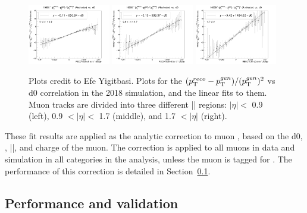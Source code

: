 \begin{figure}[!htb]
      \centering
      \captionsetup{justification=justified}
      \includegraphics[width=0.32\textwidth]{pics/muon_corr/GeoFit/fit_results/2018_DY_eta_0_0p9_dRelPt2p0_Roch.png}
      \includegraphics[width=0.32\textwidth]{pics/muon_corr/GeoFit/fit_results/2018_DY_eta_0p9_1p7_dRelPt2p0_Roch.png}
      \includegraphics[width=0.32\textwidth]{pics/muon_corr/GeoFit/fit_results/2018_DY_eta_1p7_inf_dRelPt2p0_Roch.png}
      \caption{Plots credit to Efe Yigitbasi.
               Plots for the $(p_{\mathrm{T}}^{reco}-p_{\mathrm{T}}^{gen})/ (p_{\mathrm{T}}^{gen})^{2}$ vs d0 correlation in the 2018 \DY simulation, 
               and the linear fits to them. Muon tracks are divided into three different |\eta| regions:
               $|\eta| <$ 0.9 (left), 0.9 $< |\eta| <$ 1.7 (middle), and 1.7 $< |\eta|$ (right).
               }
      \label{fig:geofit_param_2018}
\end{figure}

These fit results are applied as the analytic correction to muon \pt, 
based on the d0, \pt, |\eta|, and charge of the muon.
The correction is applied to all muons in data and simulation in all categories in the \hmm analysis, 
unless the muon is tagged for \FSR.
The performance of this correction is detailed in Section~\ref{sec:perf_geofit}.

\subsection{Performance and validation}\label{sec:perf_geofit}

